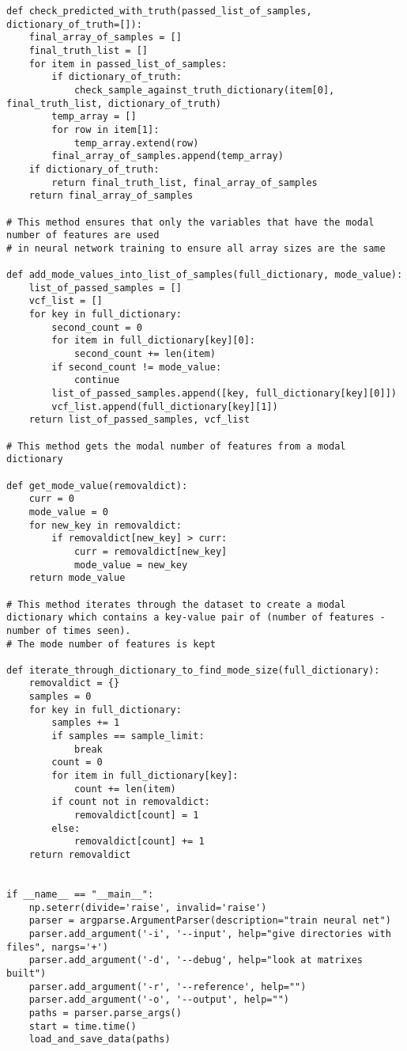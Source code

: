 \documentclass{article}
\begin{document}
\begin{verbatim}
def check_predicted_with_truth(passed_list_of_samples, dictionary_of_truth=[]):
    final_array_of_samples = []
    final_truth_list = []
    for item in passed_list_of_samples:
        if dictionary_of_truth:
            check_sample_against_truth_dictionary(item[0], final_truth_list, dictionary_of_truth)
        temp_array = []
        for row in item[1]:
            temp_array.extend(row)
        final_array_of_samples.append(temp_array)
    if dictionary_of_truth:
        return final_truth_list, final_array_of_samples
    return final_array_of_samples

# This method ensures that only the variables that have the modal number of features are used 
# in neural network training to ensure all array sizes are the same

def add_mode_values_into_list_of_samples(full_dictionary, mode_value):
    list_of_passed_samples = []
    vcf_list = []
    for key in full_dictionary:
        second_count = 0
        for item in full_dictionary[key][0]:
            second_count += len(item)
        if second_count != mode_value:
            continue
        list_of_passed_samples.append([key, full_dictionary[key][0]])
        vcf_list.append(full_dictionary[key][1])
    return list_of_passed_samples, vcf_list

# This method gets the modal number of features from a modal dictionary

def get_mode_value(removaldict):
    curr = 0
    mode_value = 0
    for new_key in removaldict:
        if removaldict[new_key] > curr:
            curr = removaldict[new_key]
            mode_value = new_key
    return mode_value

# This method iterates through the dataset to create a modal dictionary which contains a key-value pair of (number of features - number of times seen).
# The mode number of features is kept
	
def iterate_through_dictionary_to_find_mode_size(full_dictionary):
    removaldict = {}
    samples = 0
    for key in full_dictionary:
        samples += 1
        if samples == sample_limit:
            break
        count = 0
        for item in full_dictionary[key]:
            count += len(item)
        if count not in removaldict:
            removaldict[count] = 1
        else:
            removaldict[count] += 1
    return removaldict


if __name__ == "__main__":
    np.seterr(divide='raise', invalid='raise')
    parser = argparse.ArgumentParser(description="train neural net")
    parser.add_argument('-i', '--input', help="give directories with files", nargs='+')
    parser.add_argument('-d', '--debug', help="look at matrixes built")
    parser.add_argument('-r', '--reference', help="")
    parser.add_argument('-o', '--output', help="")
    paths = parser.parse_args()
    start = time.time()
    load_and_save_data(paths)                              
\end{verbatim}
\end{document}
